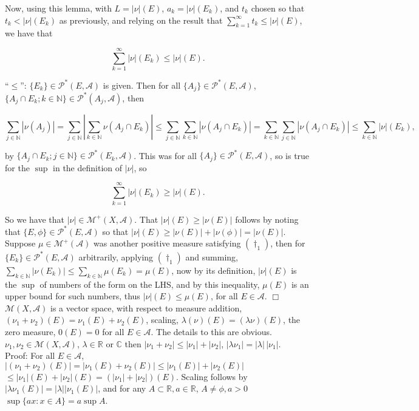 \documentclass[12pt]{article}
\newcommand{\partset}[1]{ \mathcal{P}^{*}(#1) }
\newcommand{\nats}[0] { \mathbb{N}}
\newcommand{\reals}[0] { \mathbb{R}}
\newcommand{\complexes}[0] { \mathbb{C}}
\newcommand{\A}[0] { \mathcal{A} }
\newcommand{\M}[0] { \mathcal{M} }
\begin{document}
\noindent
Now, using this lemma, with $L = |\nu|(E)$, $a_k = |\nu|(E_k)$, and ${t_k}$ chosen so that ${t_k} < |\nu|(E_k)$ as previously, and relying on the result that $ \sum_{k=1}^\infty t_k \le  |\nu|(E) $, we have that

$$
\sum_{k=1}^\infty |\nu|(E_k) \le |\nu|(E).
$$



\noindent
``$\le$'':  $\{ E_k \} \in \partset{ E, \A }$ is given. Then for all $\{ A_j \} \in \partset{ E, \A }$, $\{ A_j \cap E_k; k \in \nats \} \in \partset{ A_j, \A }$, then

$$
    \sum_{j \in \nats} | \nu(A_j) | = \sum_{j \in \nats} | \sum_{k \in \nats} \nu( A_j \cap E_k)| 
    \le \sum_{j \in \nats} \sum_{k \in \nats} | \nu(A_j \cap E_k) | 
    =   \sum_{k \in \nats} \sum_{j \in \nats} | \nu(A_j \cap E_k) | \le \sum_{k \in \nats} |\nu|(E_k),
$$


\noindent
by $\{ A_j \cap E_k; j \in \nats \} \in \partset{ E_k, \A }$. This was for all $\{ A_j \} \in \partset{ E, \A }$, so is true for the $\sup$ in the definition of $|\nu|$, so

$$
\sum_{k=1}^\infty |\nu|(E_k) \ge |\nu|(E).
$$

\noindent
So we have that $|\nu| \in \M^+(X, \A)$. That $|\nu|(E) \ge |\nu(E)|$ follows by noting that $ \{ E, \phi \} \in \partset{E,\A}$ so that $|\nu|(E) \ge |\nu(E)| + |\nu(\phi)| = |\nu(E)|$. Suppose $\mu \in \M^+(\A)$ was another positive measure satisfying ${(\dagger_1)}$, then for $\{ E_k \} \in \partset{E,\A}$ arbitrarily, applying ${(\dagger_1)}$ and summing, $\sum_{k \in \nats} |\nu(E_k)| \le \sum_{k \in \nats} \mu(E_k) = \mu(E)$, now by its definition, $|\nu|(E)$ is the $\sup$ of numbers of the form on the LHS, and by this inequality, $\mu(E)$ is an upper bound for such numbers, thus $|\nu|(E) \le \mu(E)$, for all $E \in \A$.  $\Box$ \\

$\M(X, \A)$ is a vector space, with respect to measure addition, $(\nu_1 + \nu_2)(E) = \nu_1(E) + \nu_2(E)$, scaling, $\lambda(\nu)(E) = (\lambda \nu)(E)$, the zero measure, $0(E) = 0$ for all $E \in \A$. The details to this are obvious.\\

$\nu_1, \nu_2 \in \M(X, \A)$, $\lambda \in \reals$ or $\complexes$ then $|\nu_1 + \nu_2| \le |\nu_1| + |\nu_2|$, $|\lambda \nu_1| = |\lambda| \, |\nu_1|$. \\

\noindent
Proof: For all $E \in \A$, $|(\nu_1 + \nu_2)(E)| = |\nu_1(E) + \nu_2(E)| \le |\nu_1(E)| + |\nu_2(E)|$ 
$\le |\nu_1|(E) + |\nu_2|(E) = (|\nu_1| + |\nu_2|)(E)$. Scaling follows by $|\lambda \nu_1(E)| = |\lambda| |\nu_1(E)|$, and for any $A \subset \reals, a \in \reals$, $A \not = \phi, a > 0$   $\sup \{ a x: x \in A \} = a \sup A$.\\
\end{document}
